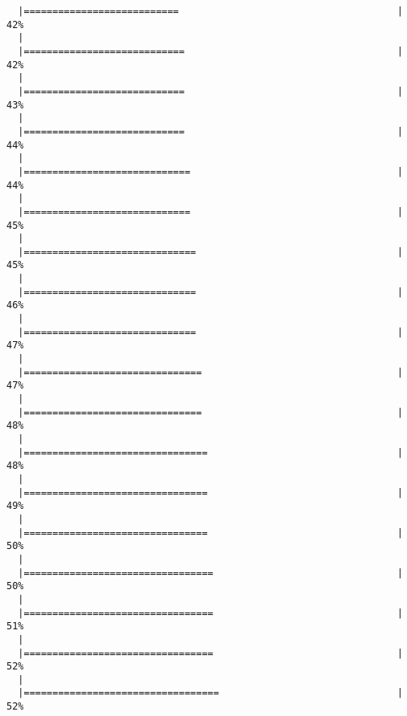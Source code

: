 \documentclass[]{article}
\begin{document}
\begin{verbatim}
  |===========================                                      |  42%
  |                                                                       
  |============================                                     |  42%
  |                                                                       
  |============================                                     |  43%
  |                                                                       
  |============================                                     |  44%
  |                                                                       
  |=============================                                    |  44%
  |                                                                       
  |=============================                                    |  45%
  |                                                                       
  |==============================                                   |  45%
  |                                                                       
  |==============================                                   |  46%
  |                                                                       
  |==============================                                   |  47%
  |                                                                       
  |===============================                                  |  47%
  |                                                                       
  |===============================                                  |  48%
  |                                                                       
  |================================                                 |  48%
  |                                                                       
  |================================                                 |  49%
  |                                                                       
  |================================                                 |  50%
  |                                                                       
  |=================================                                |  50%
  |                                                                       
  |=================================                                |  51%
  |                                                                       
  |=================================                                |  52%
  |                                                                       
  |==================================                               |  52%

\end{verbatim}
\end{document}
